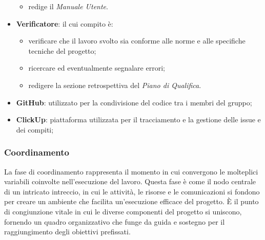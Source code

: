 \begin{itemize}
\begin{itemize}
            \item redige il \textit{Manuale Utente}. 
        \end{itemize}
    \item \textbf{Verificatore}: il cui compito è:
        \begin{itemize}
            \item verificare che il lavoro svolto sia conforme alle norme e alle specifiche tecniche del progetto;
            \item ricercare ed eventualmente segnalare errori;
            \item redigere la sezione retrospettiva del \textit{Piano di Qualifica}.
        \end{itemize}
\end{itemize}

\begin{itemize}
    \item \textbf{GitHub}: utilizzato per la condivisione del codice tra i membri del gruppo;
    \item \textbf{ClickUp}: piattaforma utilizzata per il tracciamento e la gestione delle issue e dei compiti;
\end{itemize}
\subsubsection{Coordinamento}
La fase di coordinamento rappresenta il momento in cui convergono le molteplici variabili coinvolte nell'esecuzione del lavoro. Questa fase è come il nodo centrale di un intricato intreccio, in cui le attività, le risorse e le comunicazioni si fondono per creare un ambiente che facilita un'esecuzione efficace del progetto. È il punto di congiunzione vitale in cui le diverse componenti del progetto si uniscono, fornendo un quadro organizzativo che funge da guida e sostegno per il raggiungimento degli obiettivi prefissati.

